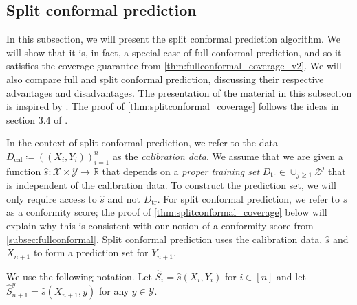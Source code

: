 \documentclass[11pt, titlepage]{article} %
\newcommand{\R}{\mathrm}
\numberwithin{equation}{section}
\theoremstyle{definition}
\numberwithin{theorem}{section}
\numberwithin{lemma}{section}
\numberwithin{corollary}{section}
\numberwithin{proposition}{section}
\numberwithin{definition}{section}
\numberwithin{remark}{section}
\begin{document}

\subsection{Split conformal prediction}
\label{subsec:splitconformal}

In this subsection, we will present the split conformal prediction algorithm. We will show that it is, in fact, a special case of full conformal prediction, and so it satisfies the coverage guarantee from \cref{thm:fullconformal_coverage_v2}. We will also compare full and split conformal prediction, discussing their respective advantages and disadvantages. The presentation of the material in this subsection is inspired by \cite{angelopoulos2024theoreticalfoundationsconformalprediction,angelopoulos2021gentle,tibs_advanced_topics}. The proof of \cref{thm:splitconformal_coverage} follows the ideas in section 3.4 of \cite{angelopoulos2024theoreticalfoundationsconformalprediction}.\vskip5pt

\noindent
In the context of split conformal prediction, we refer to the data \(D_\mathrm{cal} \coloneqq ((X_i, Y_i))_{i=1}^n\) as the \textit{calibration data}. We assume that we are given a function \(\hat{s}:\mathcal{X} \times \mathcal{Y} \to \mathbb{R}\) that depends on a \textit{proper training set} \(D_\mathrm{tr} \in \cup_{j \geq 1} \mathcal{Z}^j \) that is independent of the calibration data. To construct the prediction set, we will only require access to \(\hat{s}\) and not \(D_\R{tr}\). For split conformal prediction, we refer to \(\hat{s}\) as a conformity score; the proof of \cref{thm:splitconformal_coverage} below will explain why this is consistent with our notion of a conformity score from \cref{subsec:fullconformal}. Split conformal prediction uses the calibration data, \(\hat{s}\) and \(X_{n+1}\) to form a prediction set for \(Y_{n+1}\). \vskip5pt

\noindent
We use the following notation. Let \(\hat{S}_i = \hat{s}(X_i, Y_i)\) for \(i \in [n]\) and let \(\hat{S}_{n+1}^y = \hat{s}(X_{n+1}, y)\) for any \(y \in \mathcal{Y}\).
\end{document}

